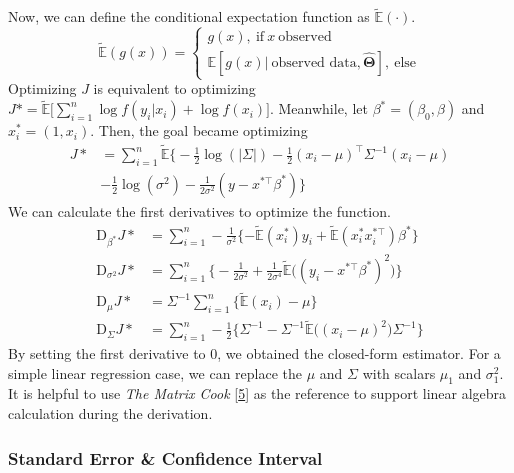 \documentclass[
  twocolumn]{article}
\begin{document}
Now, we can define the conditional expectation function as
\(\tilde{\mathbb{E}}(\cdot)\). \[
\tilde{\mathbb{E}}(g(x)) = 
\begin{cases}
    g(x), ~\text{if}~x~\text{observed} \\
    \mathbb{E}[g(x) |~\text{observed data}, \boldsymbol{\hat\Theta}], ~\text{else}
\end{cases}
\] Optimizing \(J\) is equivalent to optimizing
\(J* = \tilde{\mathbb{E}}\big[\sum_{i=1}^{n} \log f(y_i|x_i) + \log f(x_i)\big]\).
Meanwhile, let \(\beta^{*} = (\beta_0, \beta)\) and
\(x_i^{*} = (1, x_i)\). Then, the goal became optimizing \[
\begin{aligned}
J* &= \sum_{i = 1}^{n}\tilde{\mathbb{E}}\Big\{ -\frac{1}{2} \log(|\Sigma|) - \frac{1}{2} (x_i - \mu)^{\top}\Sigma^{-1}(x_i - \mu) \\
&- \frac{1}{2}\log(\sigma^2) - \frac{1}{2\sigma^2}(y - x^{*\top}\beta^{*})\Big\}
\end{aligned}
\] We can calculate the first derivatives to optimize the function. \[
\begin{aligned}
\boldsymbol{\mathrm{D}}_{{\beta}^{*}}J* &= 
\sum_{i=1}^{n} - \frac{1}{\sigma^2} \{-\tilde{\mathbb{E}}(x_i^{*})y_i + \tilde{\mathbb{E}}(x_i^{*}x_i^{*\top})\beta^{*}\} \\
\boldsymbol{\mathrm{D}}_{{\sigma}^2}J* &=
\sum_{i=1}^{n} \Big\{ - \frac{1}{2\sigma^2} + \frac{1}{2\sigma^4} \tilde{\mathbb{E}}\big((y_i-x^{*\top}\beta^{*})^2\big) \Big\}\\
\boldsymbol{\mathrm{D}}_{\mu}J* &= \Sigma^{-1} \sum_{i=1}^{n} \Big\{\tilde{\mathbb{E}}(x_i) - \mu \Big\}\\
\boldsymbol{\mathrm{D}}_{\Sigma}J* &= 
\sum_{i=1}^{n} -\frac{1}{2} \Big\{ \Sigma^{-1} - \Sigma^{-1} \tilde{\mathbb{E}}\big((x_i-\mu)^2\big) \Sigma^{-1} \Big\}
\end{aligned}
\] By setting the first derivative to 0, we obtained the closed-form
estimator. For a simple linear regression case, we can replace the
\(\mu\) and \(\Sigma\) with scalars \(\mu_1\) and \(\sigma_{1}^{2}\). It
is helpful to use \emph{The Matrix Cook}
{[}\protect\hyperlink{ref-petersen2008matrix}{5}{]} as the reference to
support linear algebra calculation during the derivation.

\hypertarget{standard-error-confidence-interval}{%
\subsubsection{Standard Error \& Confidence
Interval}\label{standard-error-confidence-interval}}
\end{document}
